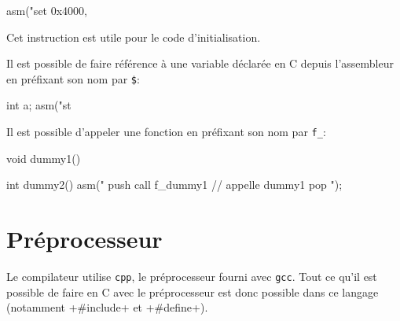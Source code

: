 \documentclass[a4paper]{article}
\begin{document}
    \begin{moc}
asm("set 0x4000, %
    \end{moc}

    Cet instruction est utile pour le code d'initialisation.

    Il est possible de faire référence à une variable déclarée en C depuis
    l'assembleur en préfixant son nom par \verb+$+:
    \begin{moc}
int a;
asm("st %
    \end{moc}

    Il est possible d'appeler une fonction en préfixant son nom par \verb+f_+:
    \begin{moc}
void dummy1() {
}

int dummy2() {
    asm("
        push %
        call f_dummy1 // appelle dummy1
        pop %
    ");
}
    \end{moc}

  \section{Préprocesseur}
    Le compilateur utilise \verb+cpp+, le préprocesseur fourni avec \verb+gcc+.
    Tout ce qu'il est possible de faire en C avec le préprocesseur est donc
    possible dans ce langage (notamment \imoc+#include+ et \imoc+#define+).
\end{document}
